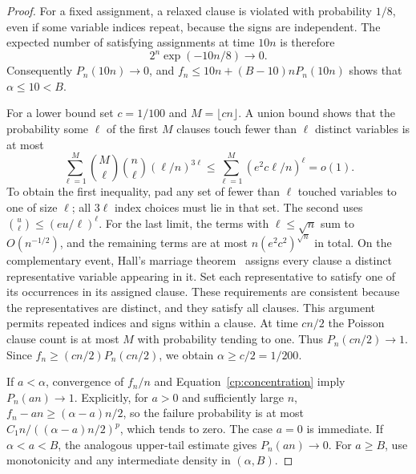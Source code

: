 \begin{proof}
For a fixed assignment, a relaxed clause is violated with probability
$1/8$, even if some variable indices repeat, because the signs are
independent. The expected number of satisfying assignments at time $10n$
is therefore
\[
 2^n\exp(-10n/8)\longrightarrow0.
\]
Consequently $P_n(10n)\to0$, and
$f_n\le10n+(B-10)nP_n(10n)$ shows that $\alpha\le10<B$.

For a lower bound set $c=1/100$ and $M=\lfloor cn\rfloor$. A union bound
shows that the probability some $\ell$ of the first $M$ clauses touch
fewer than $\ell$ distinct variables is at most
\begin{equation}\label{cp:hall-bound}
 \sum_{\ell=1}^{M}\binom M\ell\binom n\ell
       (\ell/n)^{3\ell}
 \le\sum_{\ell=1}^{M}(e^2c\ell/n)^\ell=o(1).
\end{equation}
To obtain the first inequality, pad any set of fewer than $\ell$ touched
variables to one of size $\ell$; all $3\ell$ index choices must lie in
that set. The second uses $\binom u\ell\le(eu/\ell)^\ell$.
For the last limit, the terms with $\ell\le\sqrt n$ sum to
$O(n^{-1/2})$, and the remaining terms are at most
$n(e^2c^2)^{\sqrt n}$ in total. On the complementary event, Hall's
marriage theorem~\cite[Theorem~1]{Hall1935} assigns every clause a distinct representative variable
appearing in it. Set each representative to satisfy one of its occurrences
in its assigned clause. These requirements are consistent because the
representatives are distinct, and they satisfy all clauses. This argument
permits repeated indices and signs within a clause. At time $cn/2$ the
Poisson clause count is at most $M$ with probability tending to one.
Thus $P_n(cn/2)\to1$. Since $f_n\ge(cn/2)P_n(cn/2)$, we obtain
$\alpha\ge c/2=1/200$.

If $a<\alpha$, convergence of $f_n/n$ and
Equation~\eqref{cp:concentration} imply $P_n(an)\to1$. Explicitly, for
$a>0$ and sufficiently large $n$, $f_n-an\ge(\alpha-a)n/2$, so the
failure probability is at most
$C_1n/((\alpha-a)n/2)^p$, which tends to zero. The case $a=0$ is
immediate. If $\alpha<a<B$, the analogous upper-tail estimate gives
$P_n(an)\to0$. For $a\ge B$, use monotonicity and any intermediate
density in $(\alpha,B)$.


\end{proof}
